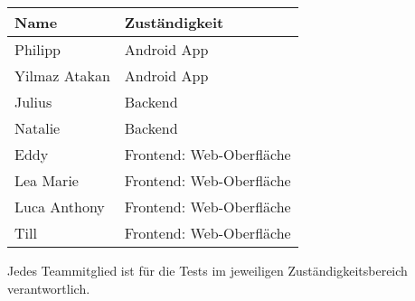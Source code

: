 \begin{center}
\begin{tabular}{ll}
 \rowcolor[HTML]{E7E7E7} 
 \textbf{Name} & \textbf{Zuständigkeit} \\ \hline
 Philipp &  Android App \\ 
 Yilmaz Atakan & Android App \\
 
  \rowcolor[HTML]{E7E7E7} 
  Julius & Backend \\  
   \rowcolor[HTML]{E7E7E7} 
 Natalie & Backend \\
 
 Eddy & Frontend: Web-Oberfläche \\  
 Lea Marie & Frontend: Web-Oberfläche \\ 
 Luca Anthony & Frontend: Web-Oberfläche \\ 
 Till & Frontend: Web-Oberfläche \\ 
\end{tabular}
\end{center}
\bigskip

\noindent
Jedes Teammitglied ist für die Tests im jeweiligen Zuständigkeitsbereich verantwortlich.


